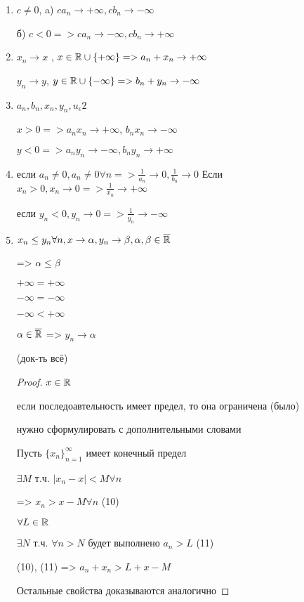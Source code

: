 \begin{enumerate}
    \item $c \neq 0$, a) $c a_n \to + \infty, c b_n \to -\infty$
    

    б) $c < 0 => c a_n \to -\infty, c b_n \to +\infty$

    \item $x_n \to x$ , $x \in \mathbb{R} \cup \{+\infty\} => a_n + x_n \to +\infty$
    

    $y_n \to y$, $y \in \mathbb{R} \cup \{-\infty\} => b_n + y_n \to -\infty$


    \item $a_n, b_n, x_n, y_n, u_\epsilon2$
    
    $x > 0 => a_n x_n \to + \infty$, $b_n x_n \to -\infty$

    $y < 0 => a_n y_n \to -\infty, b_n y_n \to +\infty$

    \item если $a_n \neq 0, a_n \neq 0 \forall n => \frac{1}{a_n} \to 0, \frac{1}{b_n} \to 0$
    Если $x_n > 0, x_n \to 0 => \frac{1}{x_n} \to +\infty$

    если $y_n < 0, y_n \to 0 => \frac{1}{y_n} \to -\infty$


    \item $x_n \leq y_n \forall n, x \to \alpha, y_n \to \beta, \alpha, \beta \in \overline {\mathbb{R}}$
    
    => $\alpha \leq \beta$

    $+\infty = +\infty$

    $-\infty = -\infty$

    $-\infty < + \infty$

    $\alpha \in \overline {\mathbb{R}}$ => $y_n \to \alpha$

    (док-ть всё)

    \begin{proof}
        $x \in \mathbb{R}$ 

        если последоавтельность имеет предел, то она ограничена (было)

        нужно сформулировать с дополнительными словами

        Пусть $\{x_n\}_{n = 1}^\infty$ имеет конечный предел

        $\exists M$ т.ч. $|x_n - x| < M \forall n$

        => $x_n > x - M \forall n$ (10)

        $\forall L \in \mathbb{R}$

        $\exists N$ т.ч. $\forall n > N$ будет выполнено $a_n > L$ (11)

        (10), (11) => $a_n + x_n > L + x - M$

        Остальные свойства доказываются аналогично
    \end{proof}

\end{enumerate}


